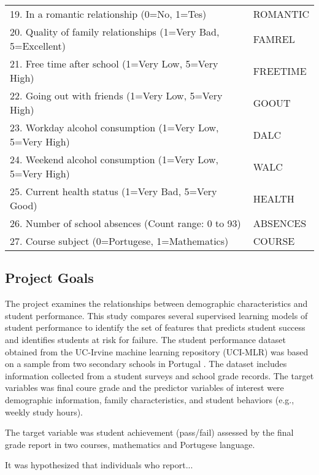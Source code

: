 \documentclass[sigconf]{acmart}
\begin{document}
\begin{table*}[ht]
\begin{tabular}{ll}
    19. In a romantic relationship (0=No, 1=Tes) & ROMANTIC  \\
    20. Quality of family relationships (1=Very Bad, 5=Excellent) & FAMREL  \\
    21. Free time after school (1=Very Low, 5=Very High) & FREETIME  \\
    22. Going out with friends (1=Very Low, 5=Very High) & GOOUT  \\
    23. Workday alcohol consumption (1=Very Low, 5=Very High) & DALC  \\
    24. Weekend alcohol consumption (1=Very Low, 5=Very High) & WALC  \\
    25. Current health status (1=Very Bad, 5=Very Good) & HEALTH  \\ 
    26. Number of school absences (Count range: 0 to 93) & ABSENCES  \\
    27. Course subject (0=Portugese, 1=Mathematics) & COURSE  \\
    \bottomrule
  \end{tabular}
\end{table*}


\subsection{Project Goals} 

The project examines the relationships between demographic characteristics
and student performance. This study compares several supervised learning models 
of student performance to identify the set of features that predicts student 
success and identifies students at risk for failure. The student performance 
dataset obtained from the UC-Irvine machine learning repository (UCI-MLR) 
was based on a sample from two secondary schools in Portugal \cite{cortez09}. 
The dataset includes information collected from a student surveys and school 
grade records. The target variables was final coure grade and the predictor 
variables of interest were demographic information, family characteristics,
and student behaviors (e.g., weekly study hours).



The target variable was student achievement (pass/fail) assessed by the 
final grade report in two courses, mathematics and Portugese language. 

It was hypothesized that individuals who report... 
\end{document}
